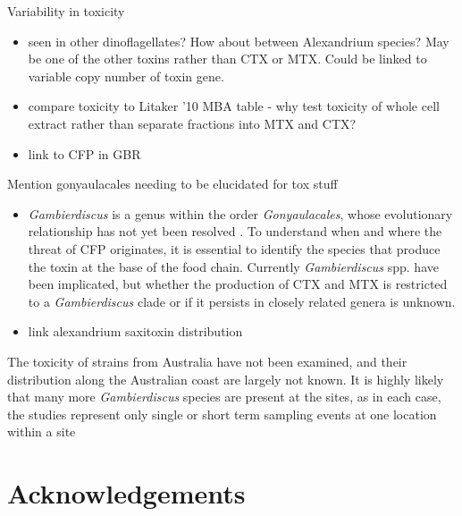 \documentclass[12pt]{article}
\begin{document}
Variability in toxicity 
\begin{itemize}
\item seen in other dinoflagellates? How about between Alexandrium species? May be one of the other toxins  rather than CTX or MTX. Could be linked to variable copy number of toxin gene.
\item compare toxicity to Litaker '10 MBA table - why test toxicity of whole cell extract rather than separate fractions into MTX and CTX?
\item link to CFP in GBR
\end{itemize}

Mention gonyaulacales needing to be elucidated for tox stuff 
\begin{itemize}
\item \emph{Gambierdiscus} is a genus within the order \emph{Gonyaulacales}, whose evolutionary relationship has not yet been resolved \cite{gentekaki2014large}. To understand when and where the threat of CFP originates, it is essential to identify the species that produce the toxin at the base of the food chain. Currently \emph{Gambierdiscus} spp. have been implicated, but whether the production of CTX and MTX is restricted to a \emph{Gambierdiscus} clade or if it  persists in closely related genera is unknown.
\item link alexandrium saxitoxin distribution
\end{itemize}


 The toxicity of strains from Australia have not been examined, and their distribution along the Australian coast are largely not known. It is highly likely that many more \emph{Gambierdiscus} species are present at the sites, as in each case, the studies represent only single or short term sampling events at one location within a site
\newpage
\section{Acknowledgements}
\end{document}
